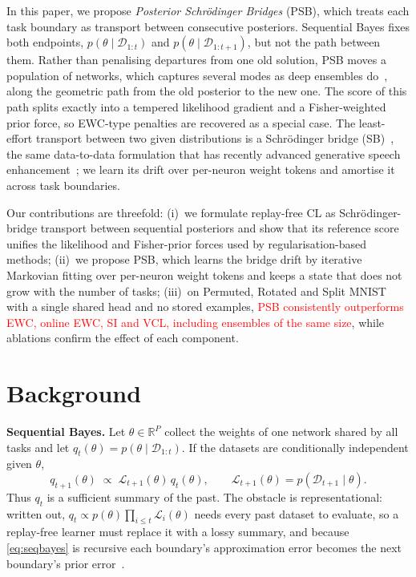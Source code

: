 \documentclass{article}
\newcommand{\tbd}[1]{\textcolor{red}{#1}}
\newcommand{\Dt}{\mathcal{D}}
\newcommand{\Lh}{\mathcal{L}}
\newcommand{\Rb}{\mathbb{R}}
\begin{document}
In this paper, we propose \emph{Posterior Schr\"odinger Bridges} (PSB), which
treats each task boundary as transport between consecutive posteriors.
Sequential Bayes fixes both endpoints, $p(\theta\mid\Dt_{1:t})$ and
$p(\theta\mid\Dt_{1:t+1})$, but not the path between them. Rather than
penalising departures from one old solution, PSB moves a population of networks,
which captures several modes as deep ensembles
do~\cite{lakshminarayanan2017ensembles,wilson2020bayesian}, along the geometric
path from the old posterior to the new one. The score of this path splits
exactly into a tempered likelihood gradient and a Fisher-weighted prior force,
so EWC-type penalties are recovered as a special case. The least-effort
transport between two given distributions is a Schr\"odinger bridge
(SB)~\cite{leonard2014survey}, the same data-to-data formulation that has
recently advanced generative speech
enhancement~\cite{jukic2024sb,richter2025objectives}; we learn its drift over
per-neuron weight tokens and amortise it across task boundaries.

Our contributions are threefold: (i)~we formulate replay-free CL as
Schr\"odinger-bridge transport between sequential posteriors and show that its
reference score unifies the likelihood and Fisher-prior forces used by
regularisation-based methods; (ii)~we propose PSB, which learns the bridge
drift by iterative Markovian fitting over per-neuron weight tokens and keeps a
state that does not grow with the number of tasks; (iii)~on Permuted, Rotated
and Split MNIST with a single shared head and no stored examples, \tbd{PSB
consistently outperforms EWC, online EWC, SI and VCL, including ensembles of
the same size}, while ablations confirm the effect of each component.

\section{Background}
\label{sec:background}

\textbf{Sequential Bayes.} Let $\theta\in\Rb^P$ collect the weights of one
network shared by all tasks and let $q_t(\theta)=p(\theta\mid\Dt_{1:t})$. If the
datasets are conditionally independent given $\theta$,
\begin{equation}
q_{t+1}(\theta) \;\propto\; \Lh_{t+1}(\theta)\,q_t(\theta),
\qquad \Lh_{t+1}(\theta)=p(\Dt_{t+1}\mid\theta).
\label{eq:seqbayes}
\end{equation}
Thus $q_t$ is a sufficient summary of the past. The obstacle is
representational: written out, $q_t\propto p(\theta)\prod_{i\le t}\Lh_i(\theta)$
needs every past dataset to evaluate, so a replay-free learner must replace it
with a lossy summary, and because \eqref{eq:seqbayes} is recursive each
boundary's approximation error becomes the next boundary's prior
error~\cite{kessler2023sequential}.
\end{document}
